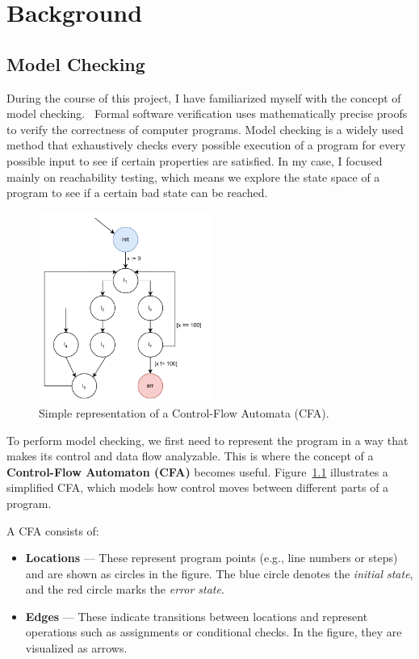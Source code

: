 \chapter{Background}

\section{Model Checking}
During the course of this project, I have familiarized myself with the concept of model checking.~\cite{modelChecking}
Formal software verification uses mathematically precise proofs to verify the correctness of computer programs. Model checking is a widely used method that exhaustively checks every possible execution of a program for every possible input to see if certain properties are satisfied.
In my case, I focused mainly on reachability testing, which means we explore the state space of a program to see if a certain bad state can be reached.

\begin{figure}[h]
  \centering
  \includegraphics[width=0.5\textwidth]{figures/cfa_simple.pdf}
  \caption{Simple representation of a Control-Flow Automata (CFA).}
  \label{fig:cfa}
\end{figure}

To perform model checking, we first need to represent the program in a way that makes its control and data flow analyzable. This is where the concept of a \textbf{Control-Flow Automaton (CFA)} becomes useful. Figure~\ref{fig:cfa} illustrates a simplified CFA, which models how control moves between different parts of a program.

A CFA consists of:
\begin{itemize}
  \item \textbf{Locations} — These represent program points (e.g., line numbers or steps) and are shown as circles in the figure. The blue circle denotes the \textit{initial state}, and the red circle marks the \textit{error state}.
  \item \textbf{Edges} — These indicate transitions between locations and represent operations such as assignments or conditional checks. In the figure, they are visualized as arrows.
\end{itemize}

